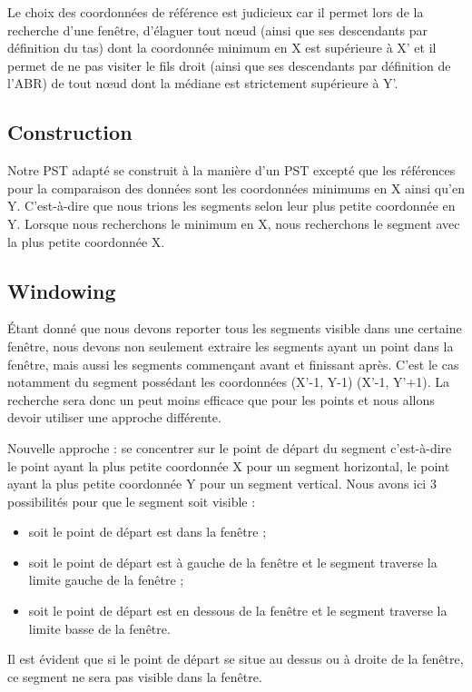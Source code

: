 \documentclass[10pt,a4paper]{article}
\begin{document}
Le choix des coordonnées de référence est judicieux car il permet lors de la recherche d'une fenêtre, d'élaguer tout nœud (ainsi que ses descendants par définition du tas) dont la coordonnée minimum en X est supérieure à X' et il permet de ne pas visiter le fils droit (ainsi que ses descendants par définition de l'ABR) de tout nœud dont la médiane est strictement supérieure à Y'.

\subsection{Construction}
Notre PST adapté se construit à la manière d'un PST excepté que les références pour la comparaison des données sont les coordonnées minimums en X ainsi qu'en Y. C'est-à-dire que nous trions les segments selon leur plus petite coordonnée en Y. Lorsque nous recherchons le minimum en X, nous recherchons le segment avec la plus petite coordonnée X.

\subsection{Windowing}
Étant donné que nous devons reporter tous les segments visible dans une certaine fenêtre, nous devons non seulement extraire les segments ayant un point dans la fenêtre, mais aussi les segments commençant avant et finissant après. C'est le cas notamment du segment possédant les coordonnées (X'-1, Y-1) (X'-1, Y'+1). La recherche sera donc un peut moins efficace que pour les points et nous allons devoir utiliser une approche différente.

Nouvelle approche : se concentrer sur le point de départ du segment c'est-à-dire le point ayant la plus petite coordonnée X pour un segment horizontal, le point ayant la plus petite coordonnée Y pour un segment vertical. Nous avons ici 3 possibilités pour que le segment soit visible :
\begin{itemize}
	\item soit le point de départ est dans la fenêtre ;
	\item soit le point de départ est à gauche de la fenêtre et le segment traverse la limite gauche de la fenêtre ;
	\item soit le point de départ est en dessous de la fenêtre et le segment traverse la limite basse de la fenêtre.
\end{itemize}
Il est évident que si le point de départ se situe au dessus ou à droite de la fenêtre, ce segment ne sera pas visible dans la fenêtre.
\end{document}
